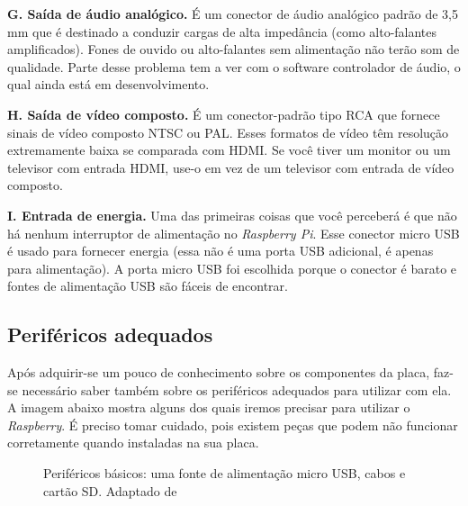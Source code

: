 \textbf{G. Saída de áudio analógico.} É um conector de áudio analógico padrão de 3,5 mm que é destinado a conduzir cargas de alta impedância (como alto-falantes amplificados). Fones de ouvido ou alto-falantes sem alimentação não terão som de qualidade. Parte desse problema tem a ver com o software controlador de áudio, o qual ainda está em desenvolvimento.

\textbf{H. Saída de vídeo composto.} É um conector-padrão tipo RCA que fornece sinais de vídeo composto NTSC ou PAL. Esses formatos de vídeo têm resolução extremamente baixa se comparada com HDMI. Se você tiver um monitor ou um televisor com entrada HDMI, use-o em vez de um televisor com entrada de vídeo composto.

\textbf{I. Entrada de energia.} Uma das primeiras coisas que você perceberá é que não há nenhum interruptor de alimentação no \textit{Raspberry Pi}. Esse conector micro USB é usado para fornecer energia (essa não é uma porta USB adicional, é apenas para alimentação). A porta micro USB foi escolhida porque o conector é barato e fontes de alimentação USB são fáceis de encontrar.

\newpage

\subsection{Periféricos adequados}

Após adquirir-se um pouco de conhecimento sobre os componentes da placa, faz-se necessário saber também sobre os periféricos adequados para utilizar com ela. A imagem abaixo mostra alguns dos quais iremos precisar para utilizar o \textit{Raspberry}. É preciso tomar cuidado, pois existem peças que podem não funcionar corretamente quando instaladas na sua placa.

\begin{figure}[ht]
    \centering
    \caption{Periféricos básicos: uma fonte de alimentação micro USB, cabos e cartão SD. Adaptado de \cite{RICHARDSON}}
\end{figure}

